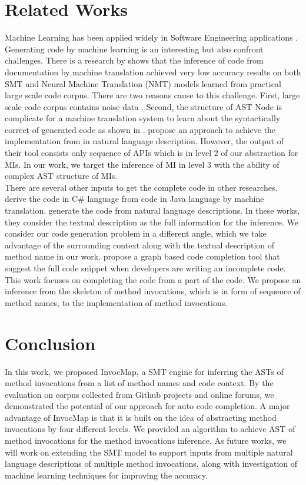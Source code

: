 \section{Related Works}
Machine Learning has been applied widely in Software Engineering applications \cite{Allamanis:2018:SML:3236632.3212695}. Generating code by machine learning is an interesting but also confront challenges. There is a research by \cite{DBLP:journals/corr/BaroneS17} shows that the inference of code from documentation by machine translation achieved very low accuracy results on both SMT and Neural Machine Translation (NMT) models learned from practical large scale code corpus. There are two reasons cause to this challenge. First, large scale code corpus contains noise data \cite{Pascarella:2017:CCC:3104188.3104217}. Second, the structure of AST Node is complicate for a machine translation system to learn about the syntactically correct of generated code as shown in \cite{DBLP:journals/corr/BaroneS17}. \cite{Gu:2016:DAL:2950290.2950334} propose an approach to achieve the implementation from  in natural language description. However, the output of their tool consists only sequence of APIs which is in level 2 of our abstraction for MIs. In our work, we target the inference of MI in level 3 with the ability of complex AST structure of MIs.
\\
There are several other inputs to get the complete code in other researches. \cite{7372046} derive the code in C\# language from code in Java language by machine translation. \cite{Gvero:2015:SJE:2814270.2814295,Gu:2016:DAL:2950290.2950334} generate the code from natural language descriptions. In these works, they consider the textual description as the full information for the inference. We consider our code generation problem in a different angle, which we take advantage of the surrounding context along with the textual description of method name in our work. \cite{6227236} propose a graph based code completion tool that suggest the full code snippet when developers are writing an incomplete code. This work focuses on completing the code from a part of the code. We propose an inference from the skeleton of method invocations, which is in form of sequence of method names, to the implementation of method invocations.
\section*{Conclusion}
In this work, we proposed InvocMap, a SMT engine for inferring
the ASTs of method invocations from a list of method
names and code context. By the evaluation on corpus
collected from Github projects and online forums, we demonstrated
the potential of our approach for auto code completion. A major
advantage of InvocMap is that it is built on the idea of abstracting
method invocations by four different levels. We provided an algorithm
to achieve AST of method invocations for the method invocations inference. As
future works, we will work on extending the SMT model to
support inputs from multiple natural language descriptions of
multiple method invocations, along with investigation of machine learning techniques for improving the accuracy. 




